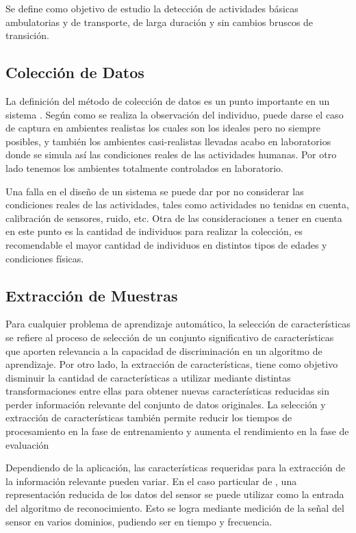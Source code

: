 Se define como objetivo de estudio la detección de actividades básicas
ambulatorias y de transporte, de larga duración y sin cambios bruscos
de transición.

\subsection{Colección de Datos}

La definición del método de colección de datos es un punto importante
en un sistema . Según como se realiza la observación del
individuo, puede darse el caso de captura en ambientes realistas los
cuales son los ideales pero no siempre posibles, y también los ambientes
casi-realistas llevadas acabo en laboratorios donde se simula así
las condiciones reales de las actividades humanas. Por otro lado tenemos
los ambientes totalmente controlados en laboratorio.

Una falla en el diseño de un sistema  se puede dar por
no considerar las condiciones reales de las actividades, tales como
actividades no tenidas en cuenta, calibración de sensores, ruido,
etc. Otra de las consideraciones a tener en cuenta en este punto es
la cantidad de individuos para realizar la colección, es recomendable
el mayor cantidad de individuos en distintos tipos de edades y condiciones
físicas.

\subsection{Extracción de Muestras}

Para cualquier problema de aprendizaje automático, la selección de
características se refiere al proceso de selección de un conjunto
significativo de características que aporten relevancia a la capacidad
de discriminación en un algoritmo de aprendizaje. Por otro lado, la
extracción de características, tiene como objetivo disminuir la cantidad
de características a utilizar mediante distintas transformaciones
entre ellas para obtener nuevas características reducidas sin perder
información relevante del conjunto de datos originales. La selección
y extracción de características también permite reducir los tiempos
de procesamiento en la fase de entrenamiento y aumenta el rendimiento
en la fase de evaluación

Dependiendo de la aplicación, las características requeridas para
la extracción de la información relevante pueden variar. En el caso
particular de , una representación reducida de los datos
del sensor se puede utilizar como la entrada del algoritmo de reconocimiento.
Esto se logra mediante medición de la señal del sensor en varios dominios,
pudiendo ser en tiempo y frecuencia.

